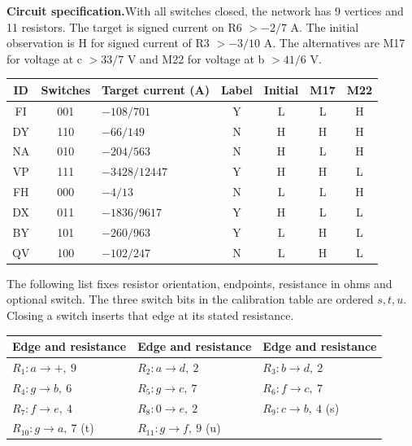 \documentclass[12pt,letterpaper]{article}
\newcommand{\reading}[2]{\par\smallskip\textsf{\color{accent}\bfseries #1}\enspace #2\par}
\begin{document}
\reading{Circuit specification.}{With all switches closed, the network has 9 vertices and 11 resistors. The target is signed current on R6 $>-2/7$ A. The initial observation is H for signed current of R3 $>-3/10$ A. The alternatives are M17 for voltage at c $>33/7$ V and M22 for voltage at b $>41/6$ V.}

\begin{center}{\small\setlength{\tabcolsep}{4pt}\begin{tabularx}{\linewidth}{@{}ccYcccc@{}}\toprule
ID & Switches & Target current (A) & Label & Initial & M17 & M22\\ \midrule
FI & 001 & $-108/701$ & Y & L & L & H\\
DY & 110 & $-66/149$ & N & H & H & H\\
NA & 010 & $-204/563$ & N & H & L & H\\
VP & 111 & $-3428/12447$ & Y & H & H & L\\
FH & 000 & $-4/13$ & N & L & L & H\\
DX & 011 & $-1836/9617$ & Y & H & L & L\\
BY & 101 & $-260/963$ & Y & L & H & L\\
QV & 100 & $-102/247$ & N & L & H & L\\\bottomrule\end{tabularx}}\end{center}

The following list fixes resistor orientation, endpoints, resistance in ohms and optional switch. The three switch bits in the calibration table are ordered $s,t,u$. Closing a switch inserts that edge at its stated resistance.

\begin{center}{\footnotesize\setlength{\tabcolsep}{4pt}\begin{tabularx}{\linewidth}{@{}YYY@{}}\toprule
Edge and resistance & Edge and resistance & Edge and resistance\\ \midrule
$R_{1}\colon a\!\to\!+,\ 9$ & $R_{2}\colon a\!\to\!d,\ 2$ & $R_{3}\colon b\!\to\!d,\ 2$\\
$R_{4}\colon g\!\to\!b,\ 6$ & $R_{5}\colon g\!\to\!c,\ 7$ & $R_{6}\colon f\!\to\!c,\ 7$\\
$R_{7}\colon f\!\to\!e,\ 4$ & $R_{8}\colon 0\!\to\!e,\ 2$ & $R_{9}\colon c\!\to\!b,\ 4$ (s)\\
$R_{10}\colon g\!\to\!a,\ 7$ (t) & $R_{11}\colon g\!\to\!f,\ 9$ (u) & \\\bottomrule\end{tabularx}}\end{center}
\end{document}
